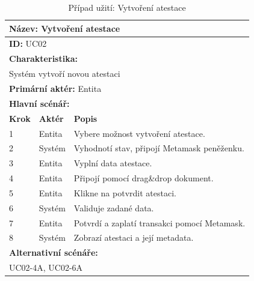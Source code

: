 \vspace{-1mm} %
\renewcommand{\arraystretch}{1.5} %
\begin{table}[h]
	\centering
	\begin{tabular}{|p{1cm}|p{2cm}|p{10cm}|}
		\hline
		\multicolumn{3}{|l|}{\textbf{Název:} Vytvoření atestace} \\ \hline
		\multicolumn{3}{|l|}{\textbf{ID:} UC02} \\ \hline
		\multicolumn{3}{|l|}{\textbf{Charakteristika:}} \\ \hline
		\multicolumn{3}{|l|}{Systém vytvoří novou atestaci} \\ \hline
		\multicolumn{3}{|l|}{\textbf{Primární aktér:} Entita} \\ \hline
		\multicolumn{3}{|l|}{\textbf{Hlavní scénář:}} \\ \hline
		\textbf{Krok} & \textbf{Aktér} & \textbf{Popis} \\ \hline
		1 & Entita & Vybere možnost vytvoření atestace. \\ \hline
		2 & Systém & Vyhodnotí stav, připojí Metamask peněženku. \\ \hline
		3 & Entita & Vyplní data atestace. \\ \hline
		4 & Entita & Připojí pomocí drag\&drop dokument.\\ \hline
		5 & Entita & Klikne na potvrdit atestaci. \\ \hline
		6 & Systém & Validuje zadané data. \\ \hline
		7 & Entita & Potvrdí a zaplatí transakci pomocí Metamask.\\ \hline
		8 & Systém & Zobrazí atestaci a její metadata. \\ \hline
		
		\multicolumn{3}{|l|}{\textbf{Alternativní scénáře:}} \\ \hline
		\multicolumn{3}{|l|}{UC02-4A, UC02-6A} \\ \hline
		
	\end{tabular}
	\vspace{10pt} %
	\caption{Případ užití: Vytvoření atestace}
	\label{tab:usecase-attestation-creation}
\end{table}
\renewcommand{\arraystretch}{1} %



